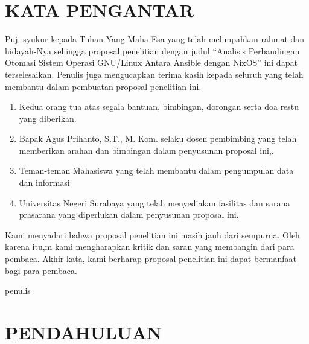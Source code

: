 \documentclass[10pt,]{report}
\begin{document}

\chapter*{KATA PENGANTAR}
\begin{justify}
	Puji syukur kepada Tuhan Yang Maha Esa yang telah melimpahkan rahmat dan
	hidayah-Nya sehingga proposal penelitian dengan judul “Analisis Perbandingan
	Otomasi Sistem Operasi GNU/Linux Antara Ansible dengan NixOS” ini
	dapat terselesaikan. Penulis juga mengucapkan terima kasih kepada seluruh
	yang telah membantu dalam pembuatan proposal penelitian ini.
	\begin{enumerate}
		\item Kedua orang tua atas segala bantuan, bimbingan, dorongan serta doa restu yang diberikan.
		\item Bapak Agus Prihanto, S.T., M. Kom. selaku dosen pembimbing yang telah memberikan arahan dan bimbingan dalam penyusunan proposal ini,.
		\item Teman-teman Mahasiswa yang telah membantu dalam pengumpulan data dan informasi
		\item Universitas Negeri Surabaya yang telah menyediakan fasilitas dan sarana prasarana yang diperlukan dalam penyusunan proposal ini.
	\end{enumerate}
	Kami menyadari bahwa proposal penelitian ini masih jauh dari sempurna. Oleh karena itu,m kami mengharapkan kritik dan saran yang membangin dari para pembaca.
	Akhir kata, kami berharap proposal penelitian ini dapat bermanfaat bagi para pembaca.
\end{justify}
\begin{FlushRight}
	penulis
\end{FlushRight}
\chapter{PENDAHULUAN}
\end{document}
